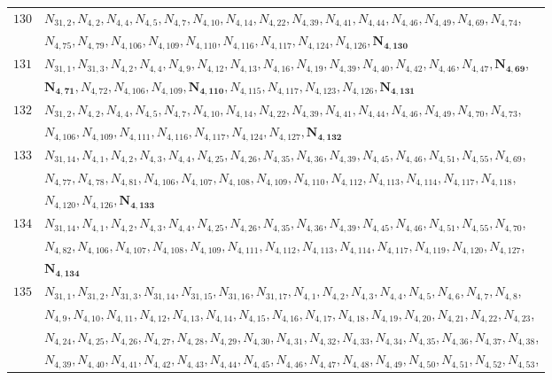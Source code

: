\documentclass{amsart}
\theoremstyle{plain}
\theoremstyle{definition}
\theoremstyle{remark}
\begin{document}
{\begin{longtable}{ll}
$130$ & $N_{31,2}, N_{4,2}, N_{4,4}, N_{4,5}, N_{4,7}, N_{4,10}, N_{4,14}, N_{4,22}, N_{4,39}, N_{4,41}, N_{4,44}, N_{4,46}, N_{4,49}, N_{4,69}, N_{4,74}$,\\ 
& $N_{4,75}, N_{4,79}, N_{4,106}, N_{4,109}, N_{4,110}, N_{4,116}, N_{4,117}, N_{4,124}, N_{4,126}, \bm{N_{4,130}}$\\
$131$ & $N_{31,1}, N_{31,3}, N_{4,2}, N_{4,4}, N_{4,9}, N_{4,12}, N_{4,13}, N_{4,16}, N_{4,19}, N_{4,39}, N_{4,40}, N_{4,42}, N_{4,46}, N_{4,47}, \bm{N_{4,69}}$,\\ 
& $\bm{N_{4,71}}, N_{4,72}, N_{4,106}, N_{4,109}, \bm{N_{4,110}}, N_{4,115}, N_{4,117}, N_{4,123}, N_{4,126}, \bm{N_{4,131}}$\\
$132$ & $N_{31,2}, N_{4,2}, N_{4,4}, N_{4,5}, N_{4,7}, N_{4,10}, N_{4,14}, N_{4,22}, N_{4,39}, N_{4,41}, N_{4,44}, N_{4,46}, N_{4,49}, N_{4,70}, N_{4,73}$,\\ 
& $N_{4,106}, N_{4,109}, N_{4,111}, N_{4,116}, N_{4,117}, N_{4,124}, N_{4,127}, \bm{N_{4,132}}$\\
$133$ & $N_{31,14}, N_{4,1}, N_{4,2}, N_{4,3}, N_{4,4}, N_{4,25}, N_{4,26}, N_{4,35}, N_{4,36}, N_{4,39}, N_{4,45}, N_{4,46}, N_{4,51}, N_{4,55}, N_{4,69}$,\\ 
& $N_{4,77}, N_{4,78}, N_{4,81}, N_{4,106}, N_{4,107}, N_{4,108}, N_{4,109}, N_{4,110}, N_{4,112}, N_{4,113}, N_{4,114}, N_{4,117}, N_{4,118}$,\\ 
& $N_{4,120}, N_{4,126}, \bm{N_{4,133}}$\\
$134$ & $N_{31,14}, N_{4,1}, N_{4,2}, N_{4,3}, N_{4,4}, N_{4,25}, N_{4,26}, N_{4,35}, N_{4,36}, N_{4,39}, N_{4,45}, N_{4,46}, N_{4,51}, N_{4,55}, N_{4,70}$,\\ 
& $N_{4,82}, N_{4,106}, N_{4,107}, N_{4,108}, N_{4,109}, N_{4,111}, N_{4,112}, N_{4,113}, N_{4,114}, N_{4,117}, N_{4,119}, N_{4,120}, N_{4,127}$,\\ 
& $\bm{N_{4,134}}$\\
$135$ & $N_{31,1}, N_{31,2}, N_{31,3}, N_{31,14}, N_{31,15}, N_{31,16}, N_{31,17}, N_{4,1}, N_{4,2}, N_{4,3}, N_{4,4}, N_{4,5}, N_{4,6}, N_{4,7}, N_{4,8}$,\\ 
& $N_{4,9}, N_{4,10}, N_{4,11}, N_{4,12}, N_{4,13}, N_{4,14}, N_{4,15}, N_{4,16}, N_{4,17}, N_{4,18}, N_{4,19}, N_{4,20}, N_{4,21}, N_{4,22}, N_{4,23}$,\\ 
& $N_{4,24}, N_{4,25}, N_{4,26}, N_{4,27}, N_{4,28}, N_{4,29}, N_{4,30}, N_{4,31}, N_{4,32}, N_{4,33}, N_{4,34}, N_{4,35}, N_{4,36}, N_{4,37}, N_{4,38}$,\\ 
& $N_{4,39}, N_{4,40}, N_{4,41}, N_{4,42}, N_{4,43}, N_{4,44}, N_{4,45}, N_{4,46}, N_{4,47}, N_{4,48}, N_{4,49}, N_{4,50}, N_{4,51}, N_{4,52}, N_{4,53}$,\\ 

\end{longtable}}
\end{document}
